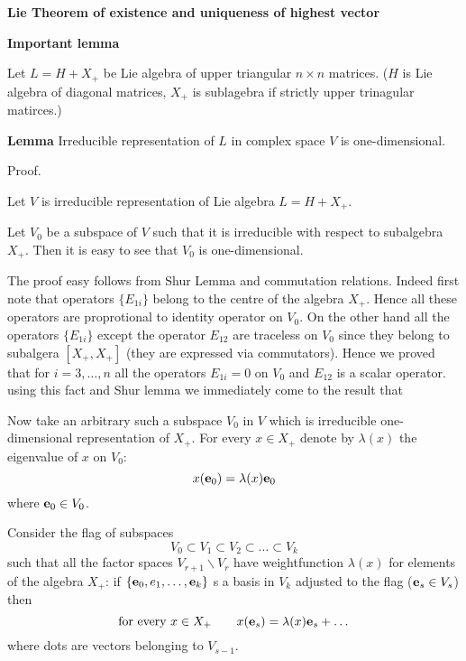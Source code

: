 
\def\e{{\bf e}}
\def\f{{\bf f}}
\def\y{{\bf y}}


       \centerline {\bf Lie Theorem of existence and uniqueness 
                  of highest vector}


     \centerline {\bf Important lemma}


   Let $L=H+X_+$ be Lie algebra of upper triangular $n\times n$  matrices.
   ($H$ is Lie algebra of diagonal matrices, $X_+$ is sublagebra if 
strictly upper trinagular matirces.)

   {\bf Lemma} Irreducible representation of $L$ in complex space $V$
is one-dimensional.



    Proof.

Let $V$ is irreducible representation of Lie algebra $L=H+X_+$.

  Let $V_0$ be a subspace of $V$ such that it is irreducible with respect
to subalgebra $X_+$. Then it is easy to see that $V_0$ is one-dimensional.

The proof easy follows from Shur Lemma and commutation relations.
Indeed first note that operators $\{E_{1i}\}$ belong to the centre of the 
algebra $X_+$. Hence all these operators are proprotional to identity
operator on $V_0$. On the other hand all the operators $\{E_{1i}\}$ 
except the operator $E_{12}$ are traceless on $V_0$ since they belong 
to subalgera $[X_+,X_+]$ (they are expressed via commutators).
Hence we proved that for $i=3,\dots,n$ all the
operators $E_{1i}=0$ on $V_0$ and $E_{12}$ is a scalar operator.
 using this fact and Shur lemma we immediately come to the result
that   


  Now take an arbitrary such a subspace $V_0$ in $V$
which  is irreducible one-dimensional representation of $X_+$.
  For every $x\in X_+$ denote by $\lambda(x)$ the eigenvalue
of $x$ on $V_0$:
            $$
       x(\e_0)=\lambda (x)\e_0
            $$
  where $\e_0\in V_0$.


  Consider the flag of subspaces
              $$
         V_0\subset V_1\subset V_2\subset\dots \subset V_k 
           $$
such that all the factor spaces $V_{r+1}\backslash V_r$
 have weightfunction  $\lambda(x)$ for elements of the algebra  $X_+$: 
if $\{\e_0,e_1,\dots,\e_k\}$ s a basis in $V_k$ adjusted to the flag
  ($\e_s\in V_s$) then     
        $$
 \hbox {for every $x\in X_+$}\qquad  
    x(\e_s)=\lambda (x) \e_s+\dots
              $$      
where dots are vectors belonging to $V_{s-1}$.

